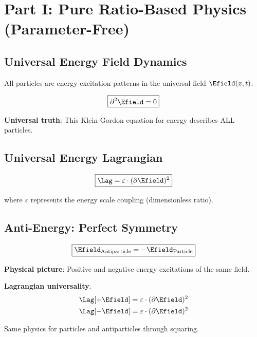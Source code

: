 	\section{Part I: Pure Ratio-Based Physics (Parameter-Free)}
	
	\subsection{Universal Energy Field Dynamics}
	
	All particles are energy excitation patterns in the universal field $\Efield(x,t)$:
	
	\begin{equation}
		\boxed{\partial^2 \Efield = 0}
		\label{eq:universal_field_equation}
	\end{equation}
	
	\textbf{Universal truth}: This Klein-Gordon equation for energy describes ALL particles.
	
	\subsection{Universal Energy Lagrangian}
	
	\begin{equation}
		\boxed{\Lag = \varepsilon \cdot (\partial \Efield)^2}
		\label{eq:universal_lagrangian}
	\end{equation}
	
	where $\varepsilon$ represents the energy scale coupling (dimensionless ratio).
	
	\subsection{Anti-Energy: Perfect Symmetry}
	
	\begin{equation}
		\boxed{\Efield_{\text{Antiparticle}} = -\Efield_{\text{Particle}}}
		\label{eq:energy_antisymmetry}
	\end{equation}
	
	\textbf{Physical picture}: Positive and negative energy excitations of the same field.
	
	\textbf{Lagrangian universality}:
	\begin{align}
		\Lag[+\Efield] &= \varepsilon \cdot (\partial \Efield)^2 \\
		\Lag[-\Efield] &= \varepsilon \cdot (\partial \Efield)^2
	\end{align}
	
	Same physics for particles and antiparticles through squaring.
	

